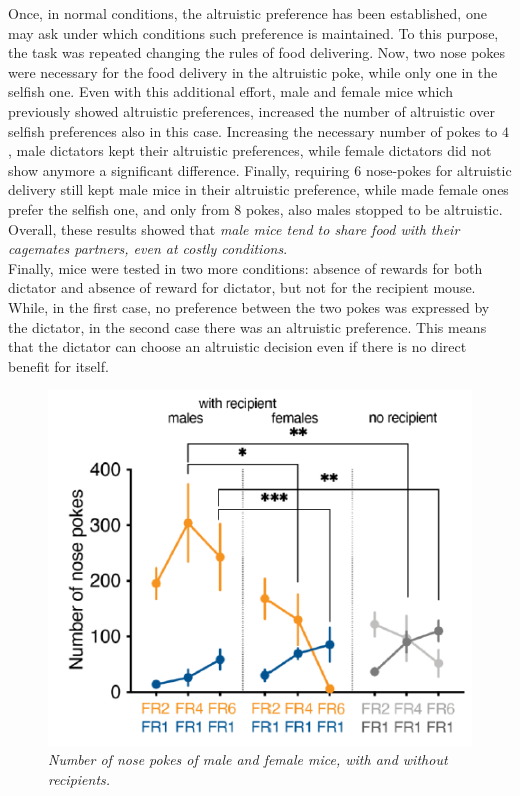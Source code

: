 \documentclass[a4paper]{article}
\begin{document}
Once, in normal conditions, the altruistic preference has been established, one may ask under which conditions such preference is maintained. To this purpose, the task was repeated changing the rules of food delivering. Now, two nose pokes were necessary for the food delivery in the altruistic poke, while only one in the selfish one. Even with this additional effort, male and female mice which previously showed altruistic preferences, increased the number of altruistic over selfish preferences also in this case. Increasing the necessary number of pokes to $4$, male dictators kept their altruistic preferences, while female dictators did not show anymore a significant difference. Finally, requiring $6$ nose-pokes for altruistic delivery still kept male mice in their altruistic preference, while made female ones prefer the selfish one, and only from $8$ pokes, also males stopped to be altruistic. Overall, these results showed that \textit{male mice tend to share food with their cagemates partners, even at costly conditions}.\\
Finally, mice were tested in two more conditions: absence of rewards for both dictator and absence of reward for dictator, but not for the recipient mouse. While, in the first case, no preference between the two pokes was expressed by the dictator, in the second case there was an altruistic preference. This means that the dictator can choose an altruistic decision even if there is no direct benefit for itself.


\begin{figure}[H]
	\begin{center}
		\includegraphics[scale=0.6]{number_pokes.png} 
	\end{center} 
	\caption{\textit{Number of nose pokes of male and female mice, with and without recipients.}}
	
\end{figure}
\end{document}
